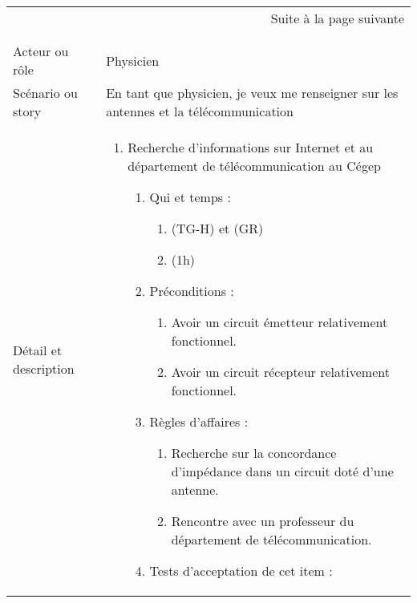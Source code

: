 \begin{longtable}{|l|p{}|}
\multicolumn{2}{r}{Suite à la page suivante} \\
\endfoot

\multicolumn{2}{r}{} \\
\endlastfoot

\hline
    \rowcolor{Gray}
    \multicolumn{2}{|l|}{1} \\
\hline
    Acteur ou rôle & Physicien  \\
\hline
    Scénario ou story & En tant que physicien, je veux me renseigner sur les antennes et la télécommunication \\
\hline
    Détail et description &
        \begin{enumerate}[label*=\arabic*.]
        \item Recherche d'informations sur Internet et au département de télécommunication au Cégep
            \begin{enumerate}[label*=\arabic*.]
                    \item Qui et temps :
                    \begin{enumerate}[label*=\arabic*.]
                        \item (TG-H) et (GR)
                        \item (1h)
                    \end{enumerate}
                    \item Préconditions :
                    \begin{enumerate}[label*=\arabic*.]
                    \item Avoir un circuit émetteur relativement fonctionnel.
                    \item Avoir un circuit récepteur relativement fonctionnel.
                    \end{enumerate}
                    \item Règles d’affaires :
                    \begin{enumerate}[label*=\arabic*.]
                        \item Recherche sur la concordance d'impédance dans un circuit doté d'une antenne.
                        \item Rencontre avec un professeur du département de télécommunication.
                    \end{enumerate}
                    \item Tests d'acceptation de cet item :
                    \begin{enumerate}[label*=\arabic*.]

\end{enumerate}
\end{enumerate}
\end{enumerate}
\end{longtable}
